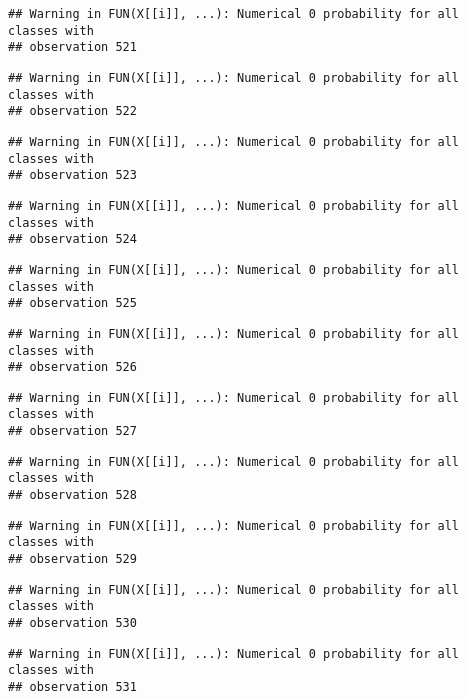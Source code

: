 \documentclass[
]{article}
\begin{document}
\begin{verbatim}
## Warning in FUN(X[[i]], ...): Numerical 0 probability for all classes with
## observation 521
\end{verbatim}

\begin{verbatim}
## Warning in FUN(X[[i]], ...): Numerical 0 probability for all classes with
## observation 522
\end{verbatim}

\begin{verbatim}
## Warning in FUN(X[[i]], ...): Numerical 0 probability for all classes with
## observation 523
\end{verbatim}

\begin{verbatim}
## Warning in FUN(X[[i]], ...): Numerical 0 probability for all classes with
## observation 524
\end{verbatim}

\begin{verbatim}
## Warning in FUN(X[[i]], ...): Numerical 0 probability for all classes with
## observation 525
\end{verbatim}

\begin{verbatim}
## Warning in FUN(X[[i]], ...): Numerical 0 probability for all classes with
## observation 526
\end{verbatim}

\begin{verbatim}
## Warning in FUN(X[[i]], ...): Numerical 0 probability for all classes with
## observation 527
\end{verbatim}

\begin{verbatim}
## Warning in FUN(X[[i]], ...): Numerical 0 probability for all classes with
## observation 528
\end{verbatim}

\begin{verbatim}
## Warning in FUN(X[[i]], ...): Numerical 0 probability for all classes with
## observation 529
\end{verbatim}

\begin{verbatim}
## Warning in FUN(X[[i]], ...): Numerical 0 probability for all classes with
## observation 530
\end{verbatim}

\begin{verbatim}
## Warning in FUN(X[[i]], ...): Numerical 0 probability for all classes with
## observation 531
\end{verbatim}
\end{document}
